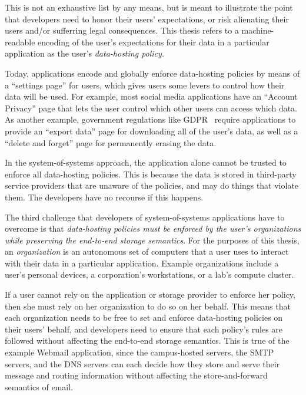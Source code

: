 This is not an exhaustive list by any means, but is meant to illustrate the point
that developers need to honor their users' expectations, or risk alienating
their users and/or sufferring legal consequences.  This thesis
refers to a machine-readable encoding of the user's expectations for their data
in a particular application as the user's \emph{data-hosting policy}.

Today, applications encode and globally enforce data-hosting policies by means of
a ``settings page'' for users, which gives users some levers to control how
their data will be used.  For example, most social media applications have an
``Account Privacy'' page that lets the user control which other users can access
which data.  As another example, government regulations like
GDPR~\cite{gdpr} require applications to provide an ``export data'' page for
downloading all of the user's data, as well as a ``delete and forget'' page for
permanently erasing the data.

In the system-of-systems approach, the application alone cannot be trusted to
enforce all data-hosting policies.  This is because the data is stored in
third-party service providers that are unaware of the policies, and may
do things that violate them.  The developers have no recourse if this happens.

The third challenge that developers of system-of-systems applications have to overcome is
that \emph{data-hosting policies must be enforced by the user's
organizations while preserving the end-to-end storage semantics}.
For the purposes of this thesis, an \emph{organization} is an
autonomous set of computers that a user uses to interact with their data 
in a particular application.  Example organizations include a
user's personal devices, a corporation's workstations, or a lab's
compute cluster. 

If a user cannot rely on the application or storage provider
to enforce her policy, then she must rely on her organization to do so on her behalf.
This means that each organization needs to be free to
set and enforce data-hosting policies on their users' behalf,
and developers need to ensure that each policy's
rules are followed without affecting the end-to-end storage semantics.
This is true of the example Webmail application, since the campus-hosted
servers, the SMTP servers, and the DNS servers can each
decide how they store and serve their message and routing information
without affecting the store-and-forward semantics of email.

